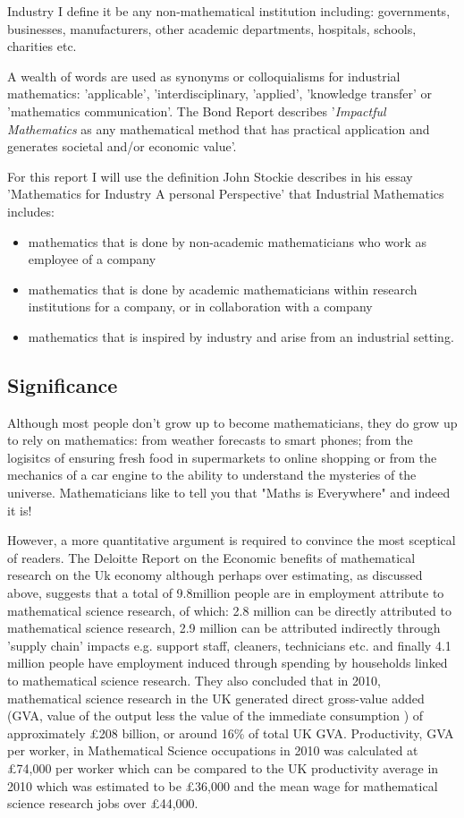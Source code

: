 \documentclass[11pt]{article} %
\begin{document}
	
 Industry  I define it be any non-mathematical institution including: governments, businesses, manufacturers, other academic departments, hospitals, schools, charities etc. 


		A wealth of words are used as synonyms or colloquialisms for industrial mathematics: 'applicable', 'interdisciplinary, 'applied', 'knowledge transfer' or 'mathematics communication'. The Bond Report \cite{Bond} describes '\textit{Impactful Mathematics} as any mathematical method that has practical application and generates societal and/or economic value'. 
		
		For this report I will use the definition John Stockie describes in his essay 'Mathematics for Industry A personal Perspective' \cite{Stockie2015} that Industrial Mathematics includes: 
		
	\begin{itemize}
	\item mathematics that is done by non-academic mathematicians who work as employee of a company
	\item mathematics that is done by academic mathematicians within research institutions for a company, or in collaboration with a company
	\item mathematics that is inspired by industry and arise from an industrial setting. 
	\end{itemize}
	
	
	\subsection{Significance}
	
Although most people don't grow up to become mathematicians, they do grow up to rely on mathematics: from weather forecasts to smart phones; from the logisitcs of ensuring fresh food in supermarkets to online shopping or from the mechanics of a car engine to  the ability to understand the mysteries of the universe. Mathematicians like to tell you that "Maths is Everywhere" and indeed it is! 

However, a more quantitative argument is required to convince the most sceptical of readers. The Deloitte Report on the Economic benefits of mathematical research on the Uk economy \cite{deloitteuk} although perhaps over estimating, as discussed above, suggests that a total of 9.8million people are in employment attribute to mathematical science research, of which: 2.8 million can be directly attributed to mathematical science research, 2.9 million can be attributed indirectly through 'supply chain' impacts e.g. support staff, cleaners, technicians etc. and finally 4.1 million people have employment induced  through spending by households linked to mathematical science research. They also concluded that in 2010, mathematical science research in the UK generated direct gross-value added (GVA, value of the output less the value of the immediate consumption ) of approximately £208 billion, or around 16\% of total UK GVA.  Productivity, GVA per worker, in Mathematical Science occupations in 2010 was calculated at £74,000 per worker which can be compared to the UK productivity average in 2010 which was estimated to be £36,000 and the mean wage for mathematical science research jobs over £44,000. 
 
\end{document}
